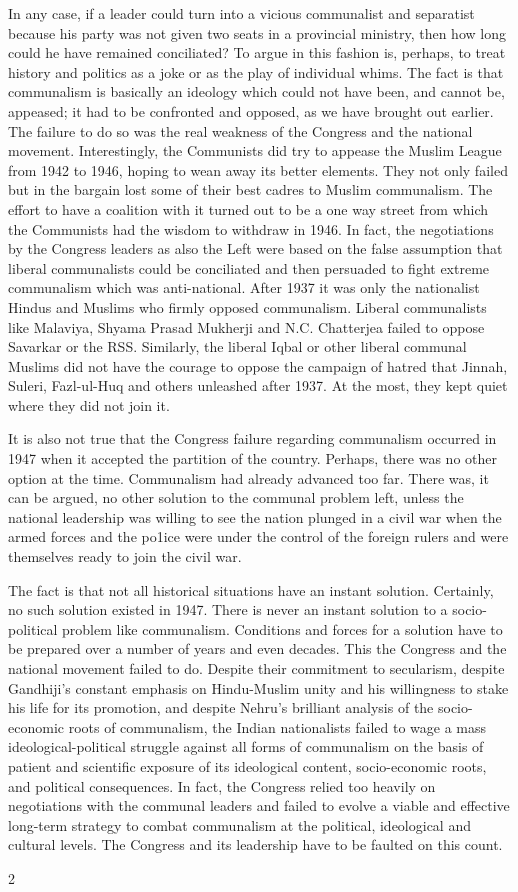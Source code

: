\begin{multicols}{2}
In any case, if a leader could turn into a vicious communalist and separatist because his party was not given two seats in a provincial ministry, then how long could he have remained conciliated? To argue in this fashion is, perhaps, to treat history and politics as a joke or as the play of individual whims. The fact is that communalism is basically an ideology which could not have been, and cannot be, appeased; it had to be confronted and opposed, as we have brought out earlier. The failure to do so was the real weakness of the Congress and the national movement. Interestingly, the Communists did try to appease the Muslim League from 1942 to 1946, hoping to wean away its better elements. They not only failed but in the bargain lost some of their best cadres to Muslim communalism. The effort to have a coalition with it turned out to be a one way street from which the Communists had the wisdom to withdraw in 1946. In fact, the negotiations by the Congress leaders as also the Left were based on the false assumption that liberal communalists could be conciliated and then persuaded to fight extreme communalism which was anti-national. After 1937 it was only the nationalist Hindus and Muslims who firmly opposed communalism. Liberal communalists like Malaviya, Shyama Prasad Mukherji and N.C. Chatterjea failed to oppose Savarkar or the RSS. Similarly, the liberal Iqbal or other liberal communal Muslims did not have the courage to oppose the campaign of hatred that Jinnah, Suleri, Fazl-ul-Huq and others unleashed after 1937. At the most, they kept quiet where they did not join it. 

It is also not true that the Congress failure regarding communalism occurred in 1947 when it accepted the partition of the country. Perhaps, there was no other option at the time. Communalism had already advanced too far. There was, it can be argued, no other solution to the communal problem left, unless the national leadership was willing to see the nation plunged in a civil war when the armed forces and the po1ice were under the control of the foreign rulers and were themselves ready to join the civil war. 

The fact is that not all historical situations have an instant solution. Certainly, no such solution existed in 1947. There is never an instant solution to a socio-political problem like communalism. Conditions and forces for a solution have to be prepared over a number of years and even decades. This the Congress and the national movement failed to do. Despite their commitment to secularism, despite Gandhiji's constant emphasis on Hindu-Muslim unity and his willingness to stake his life for its promotion, and despite Nehru's brilliant analysis of the socio-economic roots of communalism, the Indian nationalists failed to wage a mass ideological-political struggle against all forms of communalism on the basis of patient and scientific exposure of its ideological content, socio-economic roots, and political consequences. In fact, the Congress relied too heavily on negotiations with the communal leaders and failed to evolve a viable and effective long-term strategy to combat communalism at the political, ideological and cultural levels. The Congress and its leadership have to be faulted on this count.
\end{multicols}{2}
